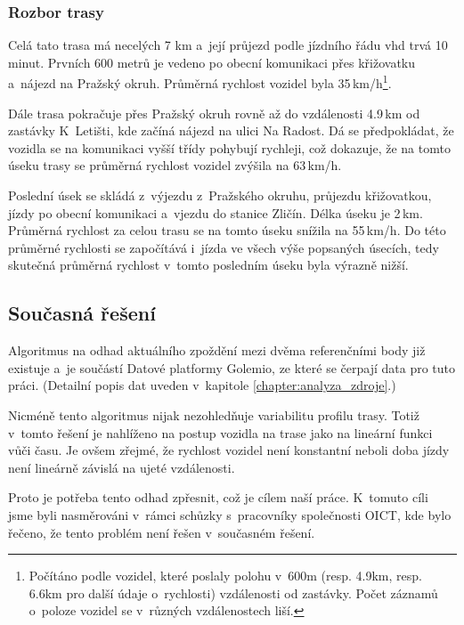 \subsubsection{Rozbor trasy}

Celá tato trasa má necelých 7 km a~její průjezd podle jízdního řádu \gls{vhd} trvá 10 minut. Prvních 600 metrů je vedeno po obecní komunikaci přes křižovatku a~nájezd na Pražský okruh. Průměrná rychlost vozidel byla 35\,km/h\footnote{Počítáno podle vozidel, které poslaly polohu v~600m (resp. 4.9km, resp. 6.6km pro další údaje o~rychlosti) vzdálenosti od zastávky. Počet záznamů o~poloze vozidel se v~různých vzdálenostech liší.}.

\bigbreak

Dále trasa pokračuje přes Pražský okruh rovně až do vzdálenosti 4.9\,km od zastávky K~Letišti, kde začíná nájezd na ulici Na Radost. Dá se předpokládat, že vozidla se na komunikaci vyšší třídy pohybují rychleji, což dokazuje, že na tomto úseku trasy se průměrná rychlost vozidel zvýšila na 63\,km/h.

\bigbreak

Poslední úsek se skládá z~výjezdu z~Pražského okruhu, průjezdu křižovatkou, jízdy po obecní komunikaci a~vjezdu do stanice Zličín. Délka úseku je 2\,km. Průměrná rychlost za celou trasu se na tomto úseku snížila na 55\,km/h. Do této průměrné rychlosti se započítává i~jízda ve všech výše popsaných úsecích, tedy skutečná průměrná rychlost v~tomto posledním úseku byla výrazně nižší.


\subsection{Současná řešení} \label{subsection:soucasna_reseni_odhadu}

Algoritmus na odhad aktuálního zpoždění mezi dvěma referenčními body již existuje a~je součástí Datové platformy Golemio, ze které se čerpají data pro tuto práci. (Detailní popis dat uveden v~kapitole \ref{chapter:analyza_zdroje}.)

\bigbreak

Nicméně tento algoritmus nijak nezohledňuje variabilitu profilu trasy. Totiž v~tomto řešení je nahlíženo na postup vozidla na trase jako na lineární funkci vůči času. Je ovšem zřejmé, že rychlost vozidel není konstantní neboli doba jízdy není lineárně závislá na ujeté vzdálenosti.

\bigbreak

Proto je potřeba tento odhad zpřesnit, což je cílem naší práce. K~tomuto cíli jsme byli nasměrováni v~rámci schůzky s~pracovníky společnosti OICT, kde bylo řečeno, že tento problém není řešen v~současném řešení.

